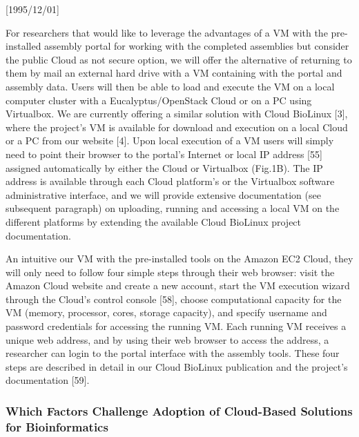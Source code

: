 \NeedsTeXFormat{LaTeX2e}[1995/12/01] \documentclass[10pt]{bmc_article}
\newenvironment{bmcformat}{\begin{raggedright}\baselineskip20pt\sloppy\setboolean{publ}{false}}{\end{raggedright}\baselineskip20pt\sloppy}
\begin{document}
\begin{bmcformat}
For researchers that would like to leverage the advantages of a VM with the pre-installed assembly portal for
working with the completed assemblies but consider the public Cloud as not secure option, we will offer the
alternative of returning to them by mail an external hard drive with a VM containing with the portal and
assembly data. Users will then be able to load and execute the VM on a local computer cluster with a
Eucalyptus/OpenStack Cloud or on a PC using Virtualbox. We are currently offering a similar solution with
Cloud BioLinux [3], where the project's VM is available for download and execution on a local Cloud or a PC
from our website [4].  Upon local execution of a VM users will simply need to point their browser to the
portal's Internet or local IP address [55] assigned automatically by either the Cloud or Virtualbox (Fig.1B).
The IP address is available through each Cloud platform's or the Virtualbox software administrative
interface, and we will provide extensive documentation (see subsequent paragraph) on uploading, running and
accessing a local VM on the different platforms by extending the available Cloud BioLinux project
documentation.

An intuitive \cite{youtube}
our VM with the pre-installed tools on the Amazon EC2 Cloud, they will only need to follow four simple steps
through their web browser: visit the Amazon Cloud website and create a new account, start the VM execution
wizard through the Cloud's control console [58], choose computational capacity for the VM (memory,
processor, cores, storage capacity), and specify username and password credentials for accessing the running
VM. Each running VM receives a unique web address, and by using their web browser to access the address, a
researcher can login to the portal interface with the assembly tools. These four steps are described in detail
in our Cloud BioLinux publication and the project's documentation [59].


\subsubsection*{Which Factors Challenge Adoption of Cloud-Based Solutions for Bioinformatics }


\end{bmcformat}
\end{document}
